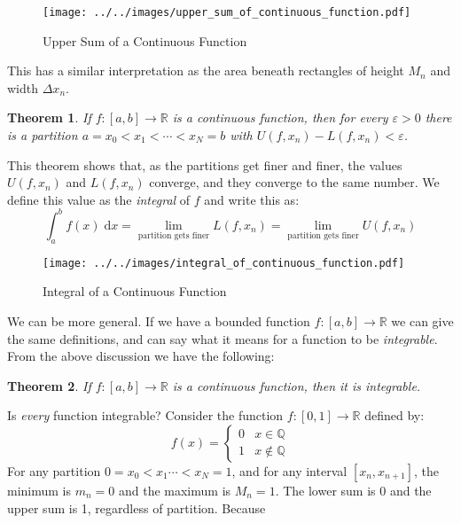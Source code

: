 \documentclass{article}
\theoremstyle{normal}
\theoremstyle{plain}
\newtheorem{theorem}{Theorem}
\begin{document}
    \begin{figure}[H]
        \centering
        \texttt{[image: ../../images/upper\_sum\_of\_continuous\_function.pdf]}
        \caption{Upper Sum of a Continuous Function}
    \end{figure}
    This has a similar interpretation as the area beneath rectangles of height
    $M_{n}$ and width $\Delta{x}_{n}$.
    \begin{theorem}
        If $f:[a,b]\rightarrow\mathbb{R}$ is a continuous function, then for
        every $\varepsilon>0$ there is a partition
        $a=x_{0}<x_{1}<\cdots<x_{N}=b$ with
        $U(f,x_{n})-L(f,x_{n})<\varepsilon$.
    \end{theorem}
    This theorem shows that, as the partitions get finer and finer, the
    values $U(f,x_{n})$ and $L(f,x_{n})$ converge, and they converge to the
    same number. We define this value as the \textit{integral} of $f$ and write
    this as:
    \begin{equation}
        \int_{a}^{b}f(x)\;\textrm{d}x
            =\lim_{\textrm{partition gets finer}}L(f,x_{n})
            =\lim_{\textrm{partition gets finer}}U(f,x_{n})
    \end{equation}
    \begin{figure}[H]
        \centering
        \texttt{[image: ../../images/integral\_of\_continuous\_function.pdf]}
        \caption{Integral of a Continuous Function}
    \end{figure}
    We can be more general. If we have a bounded function
    $f:[a,b]\rightarrow\mathbb{R}$ we can give the same definitions, and can
    say what it means for a function to be \textit{integrable}. From the above
    discussion we have the following:
    \begin{theorem}
        If $f:[a,b]\rightarrow\mathbb{R}$ is a continuous function, then it is
        integrable.
    \end{theorem}
    Is \textit{every} function integrable? Consider the function
    $f:[0,1]\rightarrow\mathbb{R}$ defined by:
    \begin{equation}
        f(x)=
        \begin{cases}
            0&x\in\mathbb{Q}\\
            1&x\notin\mathbb{Q}
        \end{cases}
    \end{equation}
    For any partition $0=x_{0}<x_{1}\cdots<x_{N}=1$, and for any interval
    $[x_{n},x_{n+1}]$, the minimum is $m_{n}=0$ and the maximum is $M_{n}=1$.
    The lower sum is 0 and the upper sum is 1, regardless of partition. Because
\end{document}
